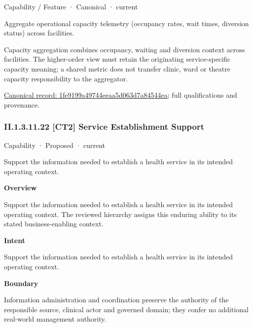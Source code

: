 \label{element:1fe9199a49744eeaa5d063d7a84544ea}
{\small Capability / Feature · Canonical · current}\par

Aggregate operational capacity telemetry (occupancy rates, wait times, diversion status) across facilities.



Capacity aggregation combines occupancy, waiting and diversion context across facilities. The higher-order view must retain the originating service-specific capacity meaning; a shared metric does not transfer clinic, ward or theatre capacity responsibility to the aggregator.


{\footnotesize \href{../../../../continuum/strategy/capability/feature/1fe9199a49744eeaa5d063d7a84544ea.md}{Canonical record: 1fe9199a49744eeaa5d063d7a84544ea}; full qualifications and provenance.}\par
\subsubsection*{II.1.3.11.22 [CT2] Service Establishment Support}
\label{navigation:II.1.3.11.22}

\label{element:20e67a41e7f44398b0f0cf3d379d8b9c}
{\small Capability · Proposed · current}\par

Support the information needed to establish a health service in its intended operating context.



\textbf{Overview}



Support the information needed to establish a health service in its intended operating context. The reviewed hierarchy assigns this enduring ability to its stated business-enabling context.



\textbf{Intent}



Support the information needed to establish a health service in its intended operating context.



\textbf{Boundary}



Information administration and coordination preserve the authority of the responsible source, clinical actor and governed domain; they confer no additional real-world management authority.


